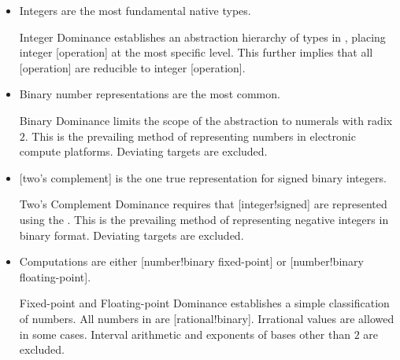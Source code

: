 \begin{itemize}
    \item[\Assume{asm:ints}] Integers are the most fundamental native types.

    \begin{highlight}{Integer Dominance}
         establishes an abstraction hierarchy of types in \basetwo, placing integer [operation] at the most specific level.
        This further implies that all [operation] are reducible to integer [operation].
    \end{highlight}

    \item[\Assume{asm:base2}] Binary number representations are the most common.

    \begin{highlight}{Binary Dominance}
         limits the scope of the \basetwo abstraction to numerals with radix \(2\).
        This is the prevailing method of representing numbers in electronic compute platforms.
        Deviating targets are excluded.
    \end{highlight}

    \item[\Assume{asm:twos_compl}] [two's complement] is the one true representation for signed binary integers.

    \begin{highlight}{Two's Complement Dominance}
         requires that [integer!signed] are represented using the .
        This is the prevailing method of representing negative integers in binary format.
        Deviating targets are excluded.
    \end{highlight}

    \item[\Assume{asm:fixed_float}] Computations are either [number!binary fixed-point] or [number!binary floating-point].

    \begin{highlight}{Fixed-point and Floating-point Dominance}
         establishes a simple classification of numbers.
        All numbers in \basetwo are [rational!binary].
        Irrational values are allowed in some cases.
        Interval arithmetic and exponents of bases other than \(2\) are excluded.
    \end{highlight}
\end{itemize}

